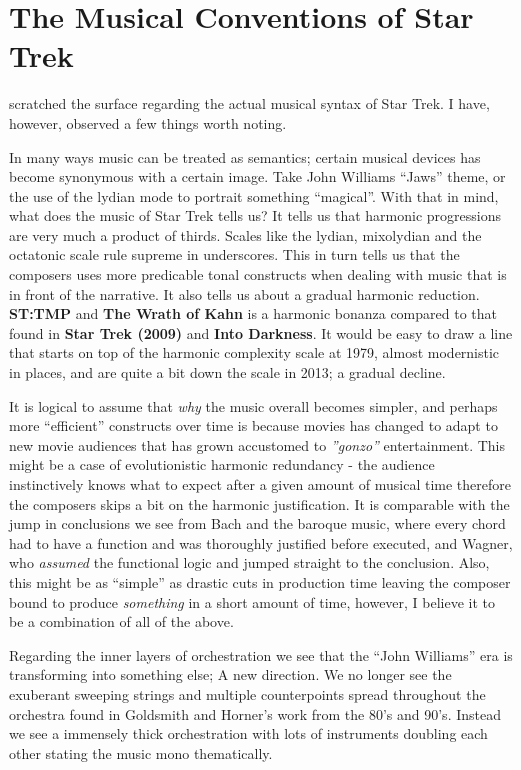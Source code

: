
\chapter{The Musical Conventions of Star Trek}\label{ch:the musical conventions}

 scratched the surface regarding the actual musical syntax of Star Trek. I have, however, observed a few things worth noting. 

In many ways music can be treated as semantics; certain musical devices has become synonymous with a certain image. Take John Williams ``Jaws'' theme, or the use of the lydian mode to portrait something ``magical''. With that in mind, what does the music of Star Trek tells us? It tells us that harmonic progressions are very much a product of thirds. Scales like the lydian, mixolydian  and the octatonic scale rule supreme in underscores. This in turn tells us that the composers uses more predicable tonal constructs when dealing with music that is in front of the narrative. It also tells us about a gradual harmonic reduction. \textbf{ST:TMP} and \textbf{The Wrath of Kahn} is a harmonic bonanza compared to that found in \textbf{Star Trek (2009)} and \textbf{Into Darkness}. It would be easy to draw a line that starts on top of the harmonic complexity scale at 1979, almost modernistic in places, and are quite a bit down the scale in 2013; a gradual decline. 

It is logical to assume that \textit{why} the music overall becomes simpler, and perhaps more ``efficient'' constructs over time is because movies has changed to adapt to new movie audiences that has grown accustomed to \textit{''gonzo''} entertainment. This might be a case of evolutionistic harmonic redundancy - the audience instinctively knows what to expect after a given amount of musical time therefore the composers skips a bit on the harmonic justification. It is comparable with the jump in conclusions we see from Bach and the baroque music, where every chord had to have a function and was thoroughly justified before executed, and Wagner, who \textit{assumed} the functional logic and jumped straight to the conclusion. Also, this might be as ``simple'' as drastic cuts in production time leaving the composer bound to produce \textit{something} in a short amount of time, however, I believe it to be a combination of all of the above.

Regarding the inner layers of orchestration we see that the ``John Williams'' era is transforming into something else; A new direction. We no longer see the exuberant sweeping strings and multiple counterpoints spread throughout the orchestra found in Goldsmith and Horner's work from the 80's and 90's. Instead we see a immensely thick orchestration with lots of instruments doubling each other stating the music mono thematically. 

